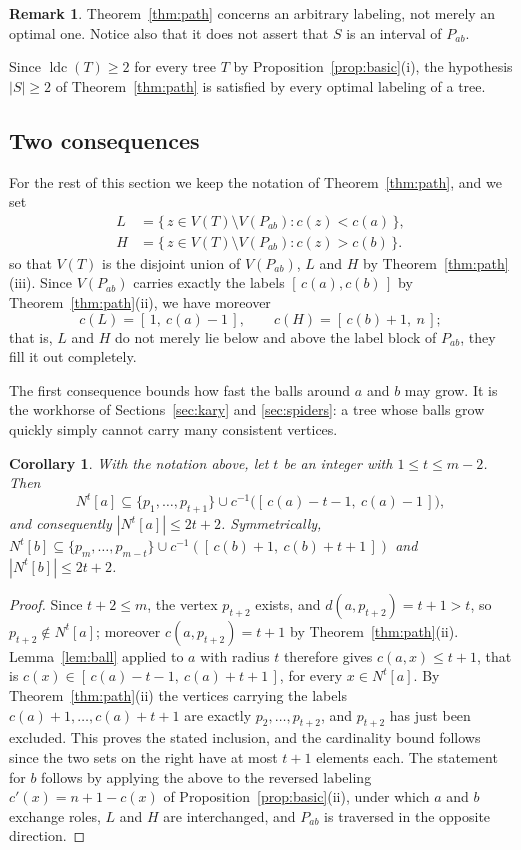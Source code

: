 \documentclass[reqno,10pt]{article}
\newtheorem{corollary}[theorem]{Corollary}
\theoremstyle{definition}
\newtheorem{remark}[theorem]{Remark}
\numberwithin{equation}{section}
\numberwithin{theorem}{section}
\newcommand{\ldc}{\operatorname{ldc}}
\newcommand{\Ball}[2]{N^{#2}[#1]}
\begin{document}
\begin{remark}
\label{rem:sharp}
Theorem~\ref{thm:path} concerns an arbitrary labeling, not merely an optimal
one. Notice also that it does not assert that $S$ is an interval of $P_{ab}$.
\end{remark}

Since $\ldc(T)\ge2$ for every tree $T$ by Proposition~\ref{prop:basic}(i), the
hypothesis $|S|\ge2$ of Theorem~\ref{thm:path} is satisfied by every optimal
labeling of a tree.

\subsection{Two consequences}

For the rest of this section we keep the notation of Theorem~\ref{thm:path},
and we set
\[
\begin{aligned}
  L&=\{\,z\in V(T)\setminus V(P_{ab}) : c(z)<c(a)\,\},\\
  H&=\{\,z\in V(T)\setminus V(P_{ab}) : c(z)>c(b)\,\}.
\end{aligned}
\]
so that $V(T)$ is the disjoint union of $V(P_{ab})$, $L$ and $H$ by
Theorem~\ref{thm:path}(iii). Since $V(P_{ab})$ carries exactly the labels
$[\,c(a),c(b)\,]$ by Theorem~\ref{thm:path}(ii), we have moreover
\[
  c(L)=[\,1,\ c(a)-1\,],\qquad c(H)=[\,c(b)+1,\ n\,];
\]
that is, $L$ and $H$ do not merely lie below and above the label block of
$P_{ab}$, they fill it out completely.

The first consequence bounds how fast the balls around $a$ and $b$ may grow.
It is the workhorse of Sections~\ref{sec:kary} and \ref{sec:spiders}: a tree
whose balls grow quickly simply cannot carry many consistent vertices.

\begin{corollary}
\label{cor:ballgrowth}
With the notation above, let $t$ be an integer with $1\le t\le m-2$. Then
\[
  \Ball{a}{t}\subseteq\{p_1,\dots,p_{t+1}\}\cup c^{-1}\bigl([\,c(a)-t-1,\ c(a)-1\,]\bigr),
\]
and consequently $|\Ball{a}{t}|\le 2t+2$. Symmetrically,
$\Ball{b}{t}\subseteq\{p_m,\dots,p_{m-t}\}\cup c^{-1}([\,c(b)+1,\ c(b)+t+1\,])$
and $|\Ball{b}{t}|\le 2t+2$.
\end{corollary}

\begin{proof}
Since $t+2\le m$, the vertex $p_{t+2}$ exists, and $d(a,p_{t+2})=t+1>t$, so
$p_{t+2}\notin\Ball{a}{t}$; moreover $c(a,p_{t+2})=t+1$ by
Theorem~\ref{thm:path}(ii). Lemma~\ref{lem:ball} applied to $a$ with radius $t$
therefore gives $c(a,x)\le t+1$, that is
$c(x)\in[\,c(a)-t-1,\ c(a)+t+1\,]$, for every $x\in\Ball{a}{t}$. By
Theorem~\ref{thm:path}(ii) the vertices carrying the labels
$c(a)+1,\dots,c(a)+t+1$ are exactly $p_2,\dots,p_{t+2}$, and $p_{t+2}$ has just
been excluded. This proves the stated inclusion, and the cardinality bound
follows since the two sets on the right have at most $t+1$ elements each. The
statement for $b$ follows by applying the above to the reversed labeling
$c'(x)=n+1-c(x)$ of Proposition~\ref{prop:basic}(ii), under which $a$ and $b$
exchange roles, $L$ and $H$ are interchanged, and $P_{ab}$ is traversed in the
opposite direction.
\end{proof}
\end{document}
